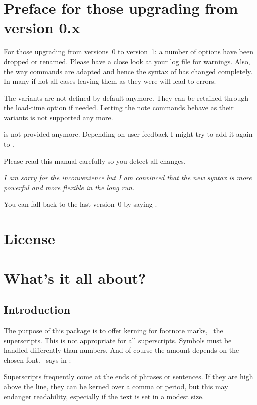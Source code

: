 \documentclass{fnpct-manual}
\begin{document}
\section{Preface for those upgrading from version 0.x}

\begin{bewareofthedog}
  For those upgrading from versions~0 to version~1: a number of options have
  been dropped or renamed. Please have a close look at your log file for
  warnings.  Also, the way commands are adapted and hence the syntax of
   has changed completely. In many if not all cases leaving them
  as they were will lead to errors. \par
  The  variants are not defined by default anymore. They can be
  retained through the load-time option  if needed.  Letting
  the note commands behave as their  variants is not supported
  any more. \par
   is not provided anymore. Depending on user feedback I might
  try to add it again to \fnpct. \par
  Please read this manual carefully so you detect all changes. \par
  \emph{I am sorry for the inconvenience but I am convinced that the new
    syntax is more powerful and more flexible in the long run.} \par
  You can fall back to the last version~0 by saying
  .
\end{bewareofthedog}

\section{License}
\license

\section{What's it all about?}
\subsection{Introduction}
The purpose of this package is to offer kerning for footnote marks, \ie\ the
superscripts. This is not appropriate for all superscripts.  Symbols must be
handled differently than numbers.  And of course the amount depends on the
chosen font.  \bringhurst\ says in :

\begin{cnltxquote}
  Superscripts frequently come at the ends of phrases or sentences.  If they
  are high above the line, they can be kerned over a comma or period, but this
  may endanger readability, especially if the text is set in a modest size.
\end{cnltxquote}
\end{document}
